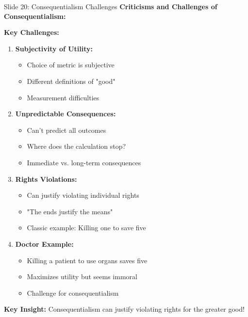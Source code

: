 \documentclass[8pt]{beamer}
\begin{document}
	\begin{frame}{Slide 20: Consequentialism Challenges}
		\fontsize{6.5}{7.5}\selectfont
		\textbf{Criticisms and Challenges of Consequentialism:}
		
		\vspace{0.1cm}
		\textbf{Key Challenges:}
		\begin{enumerate}
			\item \textbf{Subjectivity of Utility:}
			\begin{itemize}
				\item Choice of metric is subjective
				\item Different definitions of "good"
				\item Measurement difficulties
			\end{itemize}
			\item \textbf{Unpredictable Consequences:}
			\begin{itemize}
				\item Can't predict all outcomes
				\item Where does the calculation stop?
				\item Immediate vs. long-term consequences
			\end{itemize}
			\item \textbf{Rights Violations:}
			\begin{itemize}
				\item Can justify violating individual rights
				\item "The ends justify the means"
				\item Classic example: Killing one to save five
			\end{itemize}
			\item \textbf{Doctor Example:}
			\begin{itemize}
				\item Killing a patient to use organs saves five
				\item Maximizes utility but seems immoral
				\item Challenge for consequentialism
			\end{itemize}
		\end{enumerate}
		
		\textcolor{myblue}{\textbf{Key Insight:}} Consequentialism can justify \textcolor{myblue}{violating rights for the greater good}!
	\end{frame}
	
\end{document}
